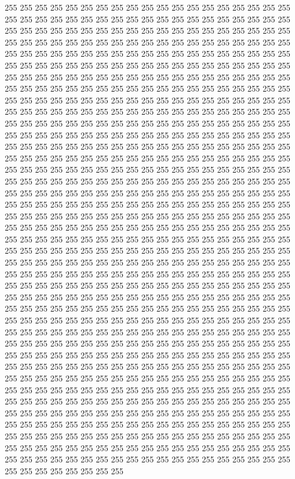 255 255 255 255 255 255 255 255 255 255 255 255 255 255 255 255 255 255 255 255 255 255 255 255 255 255 255 255 255 255 255 255 255 255 255 255 255 255 255 255 255 255 255 255 255 255 255 255 255 255 255 255 255 255 255 255 255 255 255 255 255 255 255 255 255 255 255 255 255 255 255 255 255 255 255 255 255 255 255 255 255 255 255 255 255 255 255 255 255 255 255 255 255 255 255 255 255 255 255 255 255 255 255 255 255 255 255 255 255 255 255 255 255 255 255 255 255 255 255 255 255 255 255 255 255 255 255 255 
255 255 255 255 255 255 255 255 255 255 255 255 255 255 255 255 255 255 255 255 255 255 255 255 255 255 255 255 255 255 255 255 255 255 255 255 255 255 255 255 255 255 255 255 255 255 255 255 255 255 255 255 255 255 255 255 255 255 255 255 255 255 255 255 255 255 255 255 255 255 255 255 255 255 255 255 255 255 255 255 255 255 255 255 255 255 255 255 255 255 255 255 255 255 255 255 255 255 255 255 255 255 255 255 255 255 255 255 255 255 255 255 255 255 255 255 255 255 255 255 255 255 255 255 255 255 255 255 
255 255 255 255 255 255 255 255 255 255 255 255 255 255 255 255 255 255 255 255 255 255 255 255 255 255 255 255 255 255 255 255 255 255 255 255 255 255 255 255 255 255 255 255 255 255 255 255 255 255 255 255 255 255 255 255 255 255 255 255 255 255 255 255 255 255 255 255 255 255 255 255 255 255 255 255 255 255 255 255 255 255 255 255 255 255 255 255 255 255 255 255 255 255 255 255 255 255 255 255 255 255 255 255 255 255 255 255 255 255 255 255 255 255 255 255 255 255 255 255 255 255 255 255 255 255 255 255 
255 255 255 255 255 255 255 255 255 255 255 255 255 255 255 255 255 255 255 255 255 255 255 255 255 255 255 255 255 255 255 255 255 255 255 255 255 255 255 255 255 255 255 255 255 255 255 255 255 255 255 255 255 255 255 255 255 255 255 255 255 255 255 255 255 255 255 255 255 255 255 255 255 255 255 255 255 255 255 255 255 255 255 255 255 255 255 255 255 255 255 255 255 255 255 255 255 255 255 255 255 255 255 255 255 255 255 255 255 255 255 255 255 255 255 255 255 255 255 255 255 255 255 255 255 255 255 255 
255 255 255 255 255 255 255 255 255 255 255 255 255 255 255 255 255 255 255 255 255 255 255 255 255 255 255 255 255 255 255 255 255 255 255 255 255 255 255 255 255 255 255 255 255 255 255 255 255 255 255 255 255 255 255 255 255 255 255 255 255 255 255 255 255 255 255 255 255 255 255 255 255 255 255 255 255 255 255 255 255 255 255 255 255 255 255 255 255 255 255 255 255 255 255 255 255 255 255 255 255 255 255 255 255 255 255 255 255 255 255 255 255 255 255 255 255 255 255 255 255 255 255 255 255 255 255 255 
255 255 255 255 255 255 255 255 255 255 255 255 255 255 255 255 255 255 255 255 255 255 255 255 255 255 255 255 255 255 255 255 255 255 255 255 255 255 255 255 255 255 255 255 255 255 255 255 255 255 255 255 255 255 255 255 255 255 255 255 255 255 255 255 255 255 255 255 255 255 255 255 255 255 255 255 255 255 255 255 255 255 255 255 255 255 255 255 255 255 255 255 255 255 255 255 255 255 255 255 255 255 255 255 255 255 255 255 255 255 255 255 255 255 255 255 255 255 255 255 255 255 255 255 255 255 255 255 
